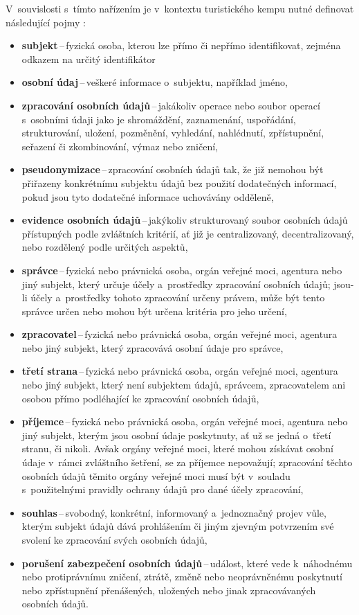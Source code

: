 V~souvislosti s~tímto nařízením je v~kontextu turistického kempu nutné definovat následující pojmy \cite[Článek 4]{eu-2016-679}:
\begin{itemize}
    \item \textbf{subjekt}\,--\,fyzická osoba, kterou lze přímo či nepřímo identifikovat, zejména odkazem na určitý identifikátor
    \item \textbf{osobní údaj}\,--\,veškeré informace o~subjektu, například jméno,
    \item \textbf{zpracování osobních údajů}\,--\,jakákoliv operace nebo soubor operací s~osobními údaji jako je shromáždění, zaznamenání, uspořádání, strukturování, uložení, pozměnění, vyhledání, nahlédnutí, zpřístupnění, seřazení či zkombinování, výmaz nebo zničení,
    \item \textbf{pseudonymizace}\,--\,zpracování osobních údajů tak, že již nemohou být přiřazeny konkrétnímu subjektu údajů bez použití dodatečných informací, pokud jsou tyto dodatečné informace uchovávány odděleně,
    \item \textbf{evidence osobních údajů}\,--\,jakýkoliv strukturovaný soubor osobních údajů přístupných podle zvláštních kritérií, ať již je centralizovaný, decentralizovaný, nebo rozdělený podle určitých aspektů,
    \item \textbf{správce}\,--\,fyzická nebo právnická osoba, orgán veřejné moci, agentura nebo jiný subjekt, který určuje účely a~prostředky zpracování osobních údajů; jsou-li účely a~prostředky tohoto zpracování určeny právem, může být tento správce určen nebo mohou být určena kritéria pro jeho určení,
    \item \textbf{zpracovatel}\,--\,fyzická nebo právnická osoba, orgán veřejné moci, agentura nebo jiný subjekt, který zpracovává osobní údaje pro správce,
    \item \textbf{třetí strana}\,--\,fyzická nebo právnická osoba, orgán veřejné moci, agentura nebo jiný subjekt, který není subjektem údajů, správcem, zpracovatelem ani osobou přímo podléhající ke zpracování osobních údajů,
    \item \textbf{příjemce}\,--\,fyzická nebo právnická osoba, orgán veřejné moci, agentura nebo jiný subjekt, kterým jsou osobní údaje poskytnuty, ať už se jedná o~třetí stranu, či nikoli. Avšak orgány veřejné moci, které mohou získávat osobní údaje v~rámci zvláštního šetření, se za příjemce nepovažují; zpracování těchto osobních údajů těmito orgány veřejné moci musí být v~souladu s~použitelnými pravidly ochrany údajů pro dané účely zpracování,
    \item \textbf{souhlas}\,--\,svobodný, konkrétní, informovaný a~jednoznačný projev vůle, kterým subjekt údajů dává prohlášením či jiným zjevným potvrzením své svolení ke zpracování svých osobních údajů,
    \item \textbf{porušení zabezpečení osobních údajů}\,--\,událost, které vede k~náhodnému nebo protiprávnímu zničení, ztrátě, změně nebo neoprávněnému poskytnutí nebo zpřístupnění přenášených, uložených nebo jinak zpracovávaných osobních údajů.
\end{itemize}

